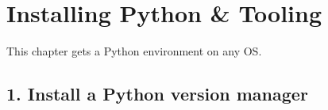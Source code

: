 \documentclass[a4paper,11pt,english]{sphinxmanual}
\begin{document}
\sphinxstepscope


\section{Installing Python \& Tooling}
\label{\detokenize{getting_started/installation:installing-python-tooling}}\label{\detokenize{getting_started/installation::doc}}
\sphinxAtStartPar
This chapter gets a  Python environment on any OS.


\subsection{1. Install a Python version manager}
\label{\detokenize{getting_started/installation:install-a-python-version-manager}}
\end{document}
